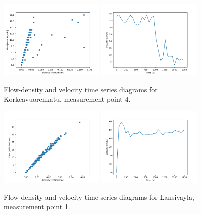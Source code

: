 \documentclass[english, 12pt, a4paper, elec, utf8, pdfa, online]{aaltothesis}
\begin{document}
\clearpage
\begin{figure}[ht!]
    \centering
    \includegraphics[width=0.45\textwidth]{graphs/Korkeavuorenkatu_4_flw_dns.png}
    \includegraphics[width=0.45\textwidth]{graphs/Korkeavuorenkatu_4_spd_time_6.png}
    \caption{Flow-density and velocity time series diagrams for Korkeavuorenkatu, measurement point 4.}
\end{figure}
\begin{figure}[ht!]
    \centering
    \includegraphics[width=0.45\textwidth]{graphs/Lansivayla_1_flw_dns.png}
    \includegraphics[width=0.45\textwidth]{graphs/Lansivayla_1_spd_time_6.png}
    \caption{Flow-density and velocity time series diagrams for Lansivayla, measurement point 1.}
\end{figure}
\end{document}
